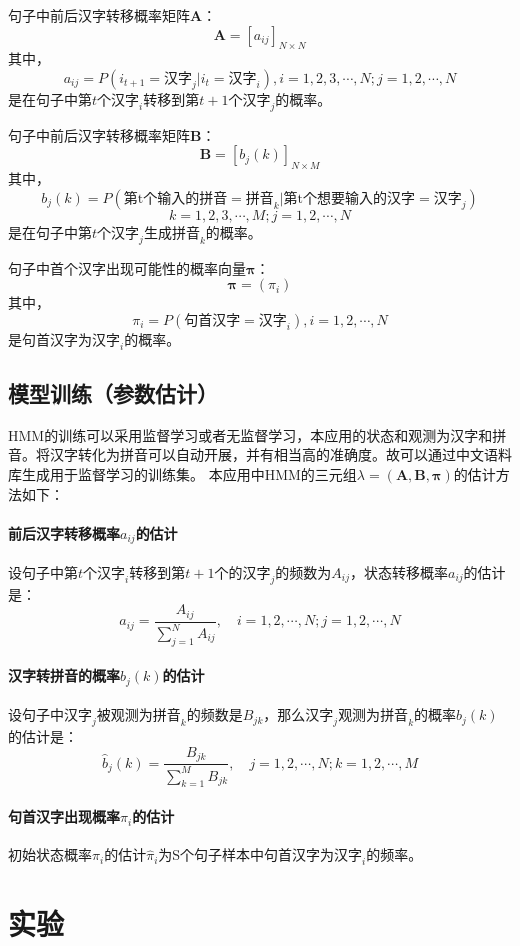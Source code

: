 \documentclass[12pt,a4paper]{ctexart}
\begin{document}
句子中前后汉字转移概率矩阵$\bm{A}$：
\[ \bm{A}=[a_{ij}]_{N\times N} \]
其中，
\[ a_{ij}=P(i_{t+1}=\mbox{汉字}_j|i_t=\mbox{汉字}_i),  i=1,2,3,\cdots,N; j=1,2,\cdots,N\]
是在句子中第$ t $个$ \mbox{汉字}_i $转移到第$ t+1 $个$ \mbox{汉字}_j $的概率。

句子中前后汉字转移概率矩阵$\bm{B}$：
\[ \bm{B}=[b_j(k)]_{N\times M} \]
其中，
\[ b_j(k)=P(\mbox{第t个输入的拼音}=\mbox{拼音}_k|\mbox{第t个想要输入的汉字}=\mbox{汉字}_j) \]
\[ k=1,2,3,\cdots,M; j=1,2,\cdots,N\]
是在句子中第$ t $个$ \mbox{汉字}_j $生成$ \mbox{拼音}_k $的概率。

句子中首个汉字出现可能性的概率向量$\bm{\pi}$：
\[ \bm{\pi}=(\pi_i) \]
其中，
\[ \pi_i=P(\mbox{句首汉字}=\mbox{汉字}_i), i=1,2,\cdots,N \]
是句首汉字为$\mbox{汉字}_i$的概率。
\subsection{模型训练（参数估计）}
HMM的训练可以采用监督学习或者无监督学习\cite{李航统计学习}，本应用的状态和观测为汉字和拼音。将汉字转化为拼音可以自动开展\cite{python-pinyin}，并有相当高的准确度\cite{accuracy-of-auto-pinyin}。故可以通过中文语料库生成用于监督学习的训练集。
本应用中HMM的三元组$ \lambda=(\bm{A},\bm{B},\bm{\pi}) $的估计方法如下：
\paragraph{前后汉字转移概率$a_{ij}$的估计}
设句子中第$ t $个$\mbox{汉字}_i$转移到第$ t+1 $个的$\mbox{汉字}_j$的频数为$A_{ij}$，状态转移概率$a_{ij}$的估计是：
\[ \hat{a}_{i j}=\frac{A_{ij}}{\sum_{j=1}^{N} A_{i j}}, \quad i=1,2, \cdots, N ; j=1,2, \cdots, N \]
\paragraph{汉字转拼音的概率$b_j(k)$的估计}
设句子中$\mbox{汉字}_j$被观测为$\mbox{拼音}_k$的频数是$B_{j k}$，那么$\mbox{汉字}_j$观测为$\mbox{拼音}_k$的概率$b_{j}(k)$的估计是：
\[ \hat{b}_{j}(k)=\frac{B_{j k}}{\sum_{k=1}^{M} B_{j k}}, \quad j=1,2, \cdots, N ; k=1,2, \cdots, M \]
\paragraph{句首汉字出现概率$\pi_i$的估计}
初始状态概率$\pi_i$的估计$\hat{\pi}_i$为S个句子样本中句首汉字为$\mbox{汉字}_i$的频率。


\section{实验}
\end{document}
